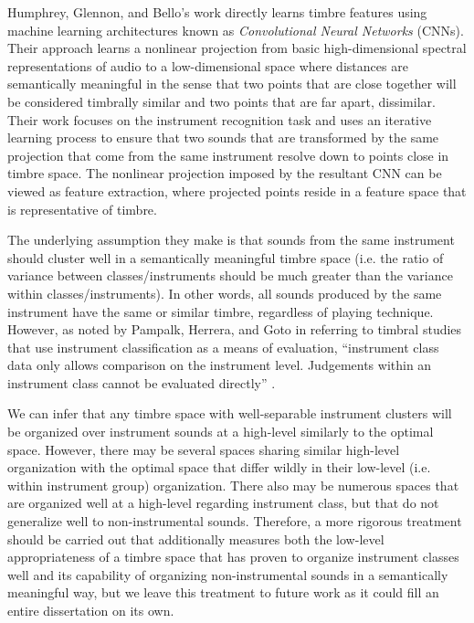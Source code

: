 \documentclass[a4paper,12pt]{report} 	%
\numberwithin{figure}{chapter}
\numberwithin{table}{chapter}
\numberwithin{equation}{chapter}
\begin{document}
\begin{flushleft}
Humphrey, Glennon, and Bello's \cite{Humphrey:2000th} work directly learns timbre features using machine learning architectures known as  \emph{Convolutional Neural Networks} (CNNs). Their approach learns a nonlinear projection from basic high-dimensional spectral representations of audio to a low-dimensional space where distances are semantically meaningful in the sense that two points that are close together will be considered timbrally similar and two points that are far apart, dissimilar. Their work focuses on the instrument recognition task and uses an iterative learning process to ensure that two sounds that are transformed by the same projection that come from the same instrument resolve down to points close in timbre space. The nonlinear projection imposed by the resultant CNN can be viewed as feature extraction, where projected points reside in a feature space that is representative of timbre.

The underlying assumption they make is that sounds from the same instrument should cluster well in a semantically meaningful timbre space (i.e. the ratio of variance between classes/instruments should be much greater than the variance within classes/instruments). In other words, all sounds produced by the same instrument have the same or similar timbre, regardless of playing technique. However, as noted by Pampalk, Herrera, and Goto in referring to timbral studies that use instrument classification as a means of evaluation, ``instrument class data only allows comparison on the instrument level. Judgements within an instrument class cannot be evaluated directly'' \cite[p. 9]{Pampalk:2008xz}. 

We can infer that any timbre space with well-separable instrument clusters will be organized over instrument sounds at a high-level similarly to the optimal space. However, there may be several spaces sharing similar high-level organization with the optimal space that differ wildly in their low-level (i.e. within instrument group) organization. There also may be numerous spaces that are organized well at a high-level regarding instrument class, but that do not generalize well to non-instrumental sounds. Therefore, a more rigorous treatment should be carried out that additionally measures both the low-level appropriateness of a timbre space that has proven to organize instrument classes well and its capability of organizing non-instrumental sounds in a semantically meaningful way, but we leave this treatment to future work as it could fill an entire dissertation on its own.


\end{flushleft}
\end{document}
